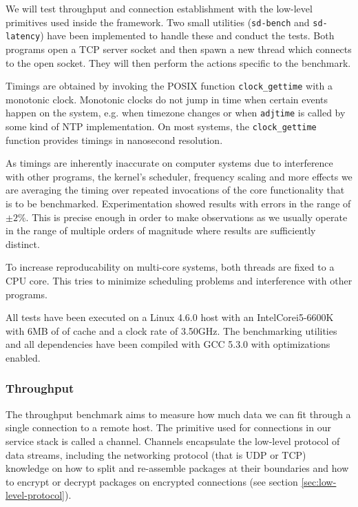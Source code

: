 We will test throughput and connection establishment with the low-level primitives used inside the framework.
Two small utilities (\lstinline{sd-bench} and \lstinline{sd-latency}) have been implemented to handle these and conduct the tests.
Both programs open a TCP server socket and then spawn a new thread which connects to the open socket.
They will then perform the actions specific to the benchmark.

Timings are obtained by invoking the POSIX function \lstinline{clock_gettime} with a monotonic clock.
Monotonic clocks do not jump in time when certain events happen on the system, e.g. when timezone changes or when \lstinline{adjtime} is called by some kind of NTP implementation.
On most systems, the \lstinline{clock_gettime} function provides timings in nanosecond resolution.

As timings are inherently inaccurate on computer systems due to interference with other programs, the kernel's scheduler, frequency scaling and more effects we are averaging the timing over repeated invocations of the core functionality that is to be benchmarked.
Experimentation showed results with errors in the range of $\pm2\%$.
This is precise enough in order to make observations as we usually operate in the range of multiple orders of magnitude where results are sufficiently distinct.

To increase reproducability on multi-core systems, both threads are fixed to a CPU core.
This tries to minimize scheduling problems and interference with other programs.


\medskip

All tests have been executed on a Linux 4.6.0 host with an Intel\textregistered Core\texttrademark i5-6600K with 6MB of of cache and a clock rate of 3.50GHz.
The benchmarking utilities and all dependencies have been compiled with GCC 5.3.0 with optimizations enabled.

\subsubsection{Throughput}

The throughput benchmark aims to measure how much data we can fit through a single connection to a remote host.
The primitive used for connections in our service stack is called a channel.
Channels encapsulate the low-level protocol of data streams, including the networking protocol (that is UDP or TCP) knowledge on how to split and re-assemble packages at their boundaries and how to encrypt or decrypt packages on encrypted connections (see section \ref{sec:low-level-protocol}).

